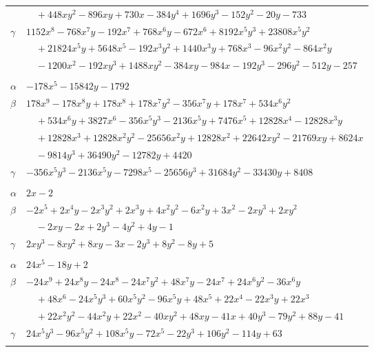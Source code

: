 \documentclass[11pt]{article}
\begin{document}
\begin{longtable}{@{}ll@{}}
 & $\quad +448xy^{2}-896xy+730x-384y^{4}+1696y^{3}-152y^{2}-20y-733$\\
$\gamma$ & $1152x^{8}-768x^{7}y-192x^{7}+768x^{6}y-672x^{6}+8192x^{5}y^{3}+23808x^{5}y^{2}$\\
 & $\quad +21824x^{5}y+5648x^{5}-192x^{3}y^{2}+1440x^{3}y+768x^{3}-96x^{2}y^{2}-864x^{2}y$\\
 & $\quad -1200x^{2}-192xy^{3}+1488xy^{2}-384xy-984x-192y^{3}-296y^{2}-512y-257$\\
\addlinespace[3pt]
\multicolumn{2}{@{}l}{$\{i,j\}=\{12,18\}$, $k_{ij}=2^{4}\cdot 5\cdot 17$}\\
$\alpha$ & $-178x^{5}-15842y-1792$\\
$\beta$ & $178x^{9}-178x^{8}y+178x^{8}+178x^{7}y^{2}-356x^{7}y+178x^{7}+534x^{6}y^{2}$\\
 & $\quad +534x^{6}y+3827x^{6}-356x^{5}y^{3}-2136x^{5}y+7476x^{5}+12828x^{4}-12828x^{3}y$\\
 & $\quad +12828x^{3}+12828x^{2}y^{2}-25656x^{2}y+12828x^{2}+22642xy^{2}-21769xy+8624x$\\
 & $\quad -9814y^{3}+36490y^{2}-12782y+4420$\\
$\gamma$ & $-356x^{5}y^{3}-2136x^{5}y-7298x^{5}-25656y^{3}+31684y^{2}-33430y+8408$\\
\addlinespace[3pt]
\multicolumn{2}{@{}l}{$\{i,j\}=\{12,25\}$, $k_{ij}=2^{2}$}\\
$\alpha$ & $2x-2$\\
$\beta$ & $-2x^{5}+2x^{4}y-2x^{3}y^{2}+2x^{3}y+4x^{2}y^{2}-6x^{2}y+3x^{2}-2xy^{3}+2xy^{2}$\\
 & $\quad -2xy-2x+2y^{3}-4y^{2}+4y-1$\\
$\gamma$ & $2xy^{3}-8xy^{2}+8xy-3x-2y^{3}+8y^{2}-8y+5$\\
\addlinespace[3pt]
\multicolumn{2}{@{}l}{$\{i,j\}=\{12,26\}$, $k_{ij}=17$}\\
$\alpha$ & $24x^{5}-18y+2$\\
$\beta$ & $-24x^{9}+24x^{8}y-24x^{8}-24x^{7}y^{2}+48x^{7}y-24x^{7}+24x^{6}y^{2}-36x^{6}y$\\
 & $\quad +48x^{6}-24x^{5}y^{3}+60x^{5}y^{2}-96x^{5}y+48x^{5}+22x^{4}-22x^{3}y+22x^{3}$\\
 & $\quad +22x^{2}y^{2}-44x^{2}y+22x^{2}-40xy^{2}+48xy-41x+40y^{3}-79y^{2}+88y-41$\\
$\gamma$ & $24x^{5}y^{3}-96x^{5}y^{2}+108x^{5}y-72x^{5}-22y^{3}+106y^{2}-114y+63$\\
\addlinespace[3pt]
\multicolumn{2}{@{}l}{$\{i,j\}=\{12,34\}$, $k_{ij}=2^{3}\cdot 3\cdot 7$}\\

\end{longtable}
\end{document}
